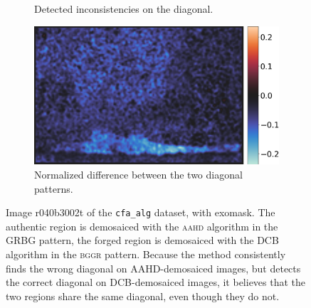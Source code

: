 \documentclass{ipol}
\begin{document}
\begin{figure}[ht]
\begin{subfigure}[t]{.235\linewidth}
                \caption{Detected inconsistencies on the diagonal.}
        \end{subfigure}\hfill%
        \begin{subfigure}[t]{.275\linewidth}
                \includegraphics[width=\linewidth]{images/aahd_dcb/out_diff_diag.png}
                \caption{Normalized difference between the two diagonal patterns.}
        \end{subfigure}
        \caption{Image r040b3002t of the \texttt{cfa\_alg} dataset, with exomask. The authentic region is demosaiced with the \textsc{aahd} algorithm in the GRBG pattern, the forged region is demosaiced with the DCB algorithm in the \textsc{bggr} pattern. Because the method consistently finds the wrong diagonal on AAHD-demosaiced images, but detects the correct diagonal on DCB-demosaiced images, it believes that the two regions share the same diagonal, even though they do not.}
        \label{fig:aahd_dcb}
\end{figure}
\end{document}
